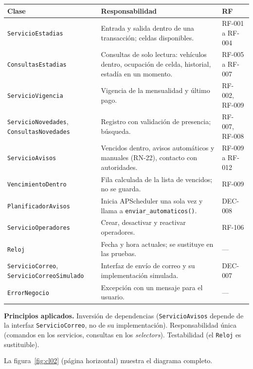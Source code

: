\begin{longtable}{>{\raggedright\arraybackslash}p{4.4cm}>{\raggedright\arraybackslash}p{7.2cm}>{\raggedright\arraybackslash}p{2.8cm}}
\toprule
\textbf{Clase} & \textbf{Responsabilidad} & \textbf{RF}\\
\midrule\endhead
\texttt{ServicioEstadias} & Entrada y salida dentro de una transacción; celdas disponibles. & RF-001 a RF-004\\
\texttt{ConsultasEstadias} & Consultas de solo lectura: vehículos dentro, ocupación de celda, historial, estadía en un momento. & RF-005 a RF-007\\
\texttt{ServicioVigencia} & Vigencia de la mensualidad y último pago. & RF-002, RF-009\\
\texttt{ServicioNovedades}, \texttt{ConsultasNovedades} & Registro con validación de presencia; búsqueda. & RF-007, RF-008\\
\texttt{ServicioAvisos} & Vencidos dentro, avisos automáticos y manuales (RN-22), contacto con autoridades. & RF-009 a RF-012\\
\texttt{VencimientoDentro} & Fila calculada de la lista de vencidos; no se guarda. & RF-009\\
\texttt{PlanificadorAvisos} & Inicia APScheduler una sola vez y llama a \texttt{enviar\_automaticos()}. & DEC-008\\
\texttt{ServicioOperadores} & Crear, desactivar y reactivar operadores. & RF-106\\
\texttt{Reloj} & Fecha y hora actuales; se sustituye en las pruebas. & ---\\
\texttt{ServicioCorreo}, \texttt{ServicioCorreoSimulado} & Interfaz de envío de correo y su implementación simulada. & DEC-007\\
\texttt{ErrorNegocio} & Excepción con un mensaje para el usuario. & ---\\
\bottomrule
\end{longtable}

\textbf{Principios aplicados.} Inversión de dependencias (\texttt{ServicioAvisos} depende de la interfaz \texttt{ServicioCorreo}, no de su implementación). Responsabilidad única (comandos en los servicios, consultas en los \emph{selectors}). Testabilidad (el \texttt{Reloj} es sustituible).

La figura~\ref{fig:cl02} (página horizontal) muestra el diagrama completo.
